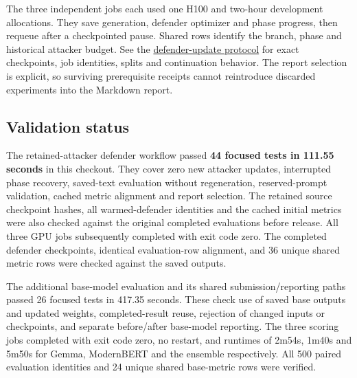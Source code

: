 The three independent jobs each used one H100 and two-hour development
allocations. They save generation, defender optimizer and phase
progress, then requeue after a checkpointed pause. Shared
\texttt{} rows identify the branch, phase and
historical attacker budget. See the
\href{records/docs/defender_comparison.tex}{defender-update protocol}
for exact checkpoints, job identities, splits and continuation behavior.
The report selection is explicit, so surviving prerequisite receipts
cannot reintroduce discarded experiments into the Markdown report.

\subsection{Validation
status}\label{record-docs-research-guide-md-validation-status}

The retained-attacker defender workflow passed \textbf{44 focused tests
in 111.55 seconds} in this checkout. They cover zero new attacker
updates, interrupted phase recovery, saved-text evaluation without
regeneration, reserved-prompt validation, cached metric alignment and
report selection. The retained source checkpoint hashes, all
warmed-defender identities and the cached initial metrics were also
checked against the original completed evaluations before release. All
three GPU jobs subsequently completed with exit code zero. The completed
defender checkpoints, identical evaluation-row alignment, and 36 unique
shared metric rows were checked against the saved outputs.

The additional base-model evaluation and its shared submission/reporting
paths passed 26 focused tests in 417.35 seconds. These check use of
saved base outputs and updated weights, completed-result reuse,
rejection of changed inputs or checkpoints, and separate before/after
base-model reporting. The three scoring jobs completed with exit code
zero, no restart, and runtimes of 2m54s, 1m40s and 5m50s for Gemma,
ModernBERT and the ensemble respectively. All 500 paired evaluation
identities and 24 unique shared base-metric rows were verified.

